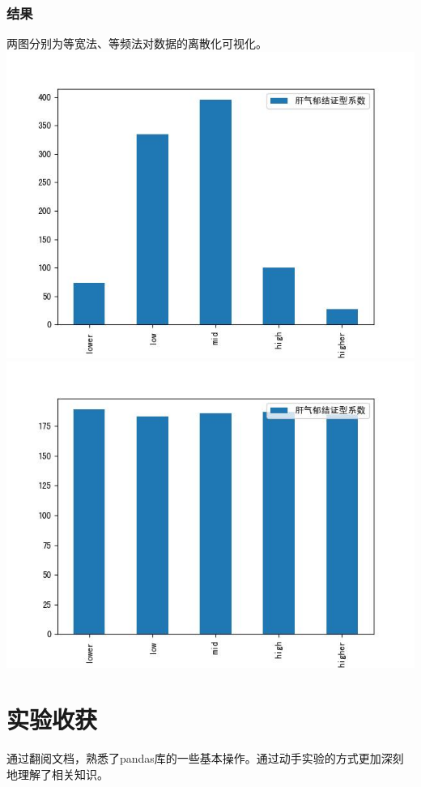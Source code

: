 \documentclass{article}
\begin{document}
        \subsubsection{结果}
            两图分别为等宽法、等频法对数据的离散化可视化。\\
            \includegraphics[scale=0.8]{img/4-1.jpg}\\
            \includegraphics[scale=0.8]{img/4-2.jpg}\\
\section{实验收获}
    通过翻阅文档，熟悉了pandas库的一些基本操作。通过动手实验的方式更加深刻地理解了相关知识。
\end{document}
